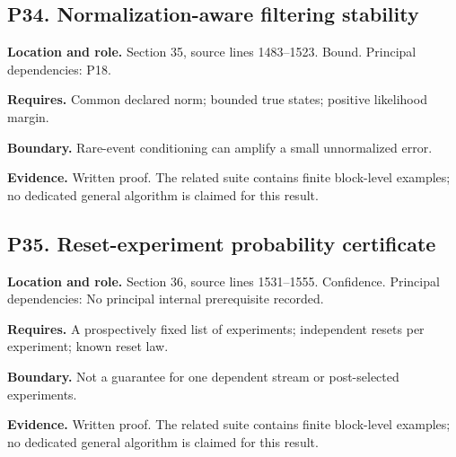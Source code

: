 \documentclass[11pt,letterpaper]{article}
\begin{document}
\par\noindent\begin{minipage}{\textwidth}
\subsection{P34. Normalization-aware filtering
stability}\label{p34.-normalization-aware-filtering-stability}

\textbf{Location and role.} Section 35, source lines 1483--1523. Bound.
Principal dependencies: P18.

\textbf{Requires.} Common declared norm; bounded true states; positive
likelihood margin.

\textbf{Boundary.} Rare-event conditioning can amplify a small
unnormalized error.

\textbf{Evidence.} Written proof. The related suite contains finite
block-level examples; no dedicated general algorithm is claimed for this
result.
\end{minipage}\par\medskip

\par\noindent\begin{minipage}{\textwidth}
\subsection{P35. Reset-experiment probability
certificate}\label{p35.-reset-experiment-probability-certificate}

\textbf{Location and role.} Section 36, source lines 1531--1555.
Confidence. Principal dependencies: No principal internal prerequisite
recorded.

\textbf{Requires.} A prospectively fixed list of experiments;
independent resets per experiment; known reset law.

\textbf{Boundary.} Not a guarantee for one dependent stream or
post-selected experiments.

\textbf{Evidence.} Written proof. The related suite contains finite
block-level examples; no dedicated general algorithm is claimed for this
result.
\end{minipage}\par\medskip
\end{document}
